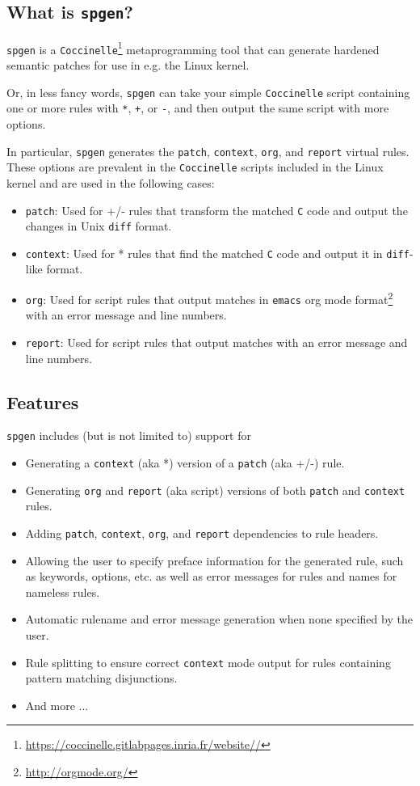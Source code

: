 \subsection{What is \texttt{spgen}?}
\texttt{spgen} is a \texttt{Coccinelle}\footnote{\url{https://coccinelle.gitlabpages.inria.fr/website//}} metaprogramming tool that can generate hardened semantic patches for use in e.g. the Linux kernel.

Or, in less fancy words, \texttt{spgen} can take your simple \texttt{Coccinelle} script containing one or more rules with \texttt{*}, \texttt{+}, or \texttt{-}, and then output the same script with more options.

In particular, \texttt{spgen} generates the \texttt{patch}, \texttt{context}, \texttt{org}, and \texttt{report} virtual rules. These options are prevalent in the \texttt{Coccinelle} scripts included in the Linux kernel and are used in the following cases:

\begin{itemize}
\item \texttt{patch}: Used for +/- rules that transform the matched \texttt{C} code and output the changes in Unix \texttt{diff} format.
\item \texttt{context}: Used for * rules that find the matched \texttt{C} code and output it in \texttt{diff}-like format.
\item \texttt{org}: Used for script rules that output matches in
  \texttt{emacs} org mode
  format\footnote{\url{http://orgmode.org/}} with
  an error message and line numbers.
\item \texttt{report}: Used for script rules that output matches with an error message and line numbers.
\end{itemize}
\bigskip

\subsection{Features}
\texttt{spgen} includes (but is not limited to) support for
\begin{itemize}
\item Generating a \texttt{context} (aka *) version of a \texttt{patch} (aka +/-) rule.
\item Generating \texttt{org} and \texttt{report} (aka script) versions of both \texttt{patch} and \texttt{context} rules.
\item Adding \texttt{patch}, \texttt{context}, \texttt{org}, and \texttt{report} dependencies to rule headers.
\item Allowing the user to specify preface information for the generated rule, such as keywords, options, etc. as well as error messages for rules and names for nameless rules.
\item Automatic rulename and error message generation when none specified by the user.
\item Rule splitting to ensure correct \texttt{context} mode output for rules containing pattern matching disjunctions.
\item And more ...
\end{itemize}